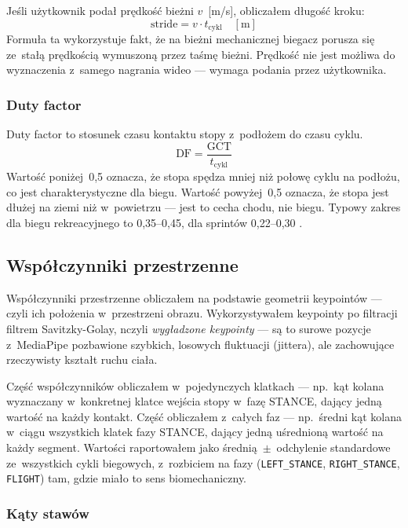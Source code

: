 Jeśli użytkownik podał prędkość bieżni $v$~[m/s], obliczałem długość kroku:
\[
\text{stride} = v \cdot t_{\text{cykl}} \quad [\text{m}]
\]
Formuła ta wykorzystuje fakt, że na bieżni mechanicznej biegacz porusza się ze~stałą prędkością wymuszoną przez taśmę bieżni. Prędkość nie jest możliwa do wyznaczenia z~samego nagrania wideo --- wymaga podania przez użytkownika. 

\subsubsection{Duty factor}

Duty factor to stosunek czasu kontaktu stopy z~podłożem do czasu cyklu.
\[
\text{DF} = \frac{\text{GCT}}{t_{\text{cykl}}}
\]
Wartość poniżej~0{,}5 oznacza, że stopa spędza mniej niż połowę cyklu na podłożu, co jest charakterystyczne dla biegu. Wartość powyżej~0{,}5 oznacza, że stopa jest dłużej na ziemi niż w~powietrzu --- jest to cecha chodu, nie biegu. Typowy zakres dla biegu rekreacyjnego to 0{,}35--0{,}45, dla sprintów 0{,}22--0{,}30 \cite{souza2016}.

\subsection{Współczynniki przestrzenne}
\label{sec:spatial}

Współczynniki przestrzenne obliczałem na podstawie geometrii keypointów --- czyli ich położenia w~przestrzeni obrazu. Wykorzystywałem keypointy po filtracji filtrem Savitzky-Golay, nczyli \textit{wygładzone keypointy} --- są to surowe pozycje z~MediaPipe pozbawione szybkich, losowych fluktuacji (jittera), ale zachowujące rzeczywisty kształt ruchu ciała.

Część współczynników obliczałem w~pojedynczych klatkach --- np.~kąt kolana wyznaczany w~konkretnej klatce wejścia stopy w~fazę STANCE, dający jedną wartość na każdy kontakt. Część obliczałem z~całych faz --- np.~średni kąt kolana w~ciągu wszystkich klatek fazy STANCE, dający jedną uśrednioną wartość na każdy segment. Wartości raportowałem jako średnią~$\pm$~odchylenie standardowe ze~wszystkich cykli biegowych, z~rozbiciem na fazy (\texttt{LEFT\_STANCE}, \texttt{RIGHT\_STANCE}, \texttt{FLIGHT}) tam, gdzie miało to sens biomechaniczny.

\subsubsection{Kąty stawów}

